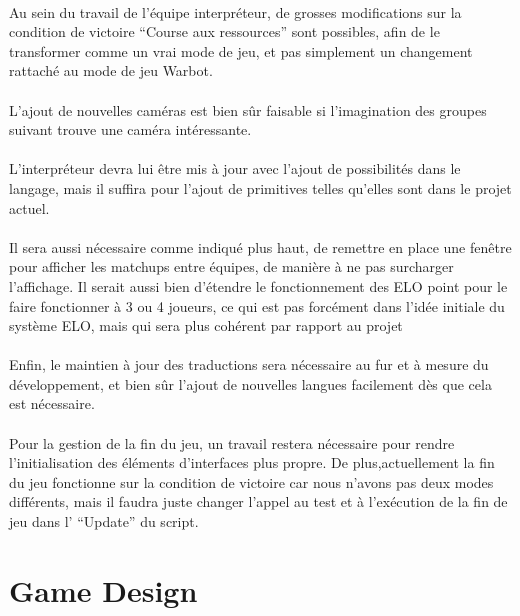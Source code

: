 \documentclass{report}
\begin{document}
\paragraph{}
Au sein du travail de l’équipe interpréteur, de grosses modifications sur la condition de victoire “Course aux ressources” sont possibles, afin de le transformer comme un vrai mode de jeu, et pas simplement un changement rattaché au mode de jeu Warbot. 
\paragraph{}
L’ajout de nouvelles caméras est bien sûr faisable si l’imagination des groupes suivant trouve une caméra intéressante. 
\paragraph{}
L’interpréteur devra lui être mis à jour avec l’ajout de possibilités dans le langage, mais il suffira pour l’ajout de primitives telles qu’elles sont dans le projet actuel.
\paragraph{}
Il sera aussi nécessaire comme indiqué plus haut, de remettre en place une fenêtre pour afficher les matchups entre équipes, de manière à ne pas surcharger l’affichage. Il serait aussi bien d’étendre le fonctionnement des ELO point pour le faire fonctionner à 3 ou 4 joueurs, ce qui est pas forcément dans l’idée initiale du système ELO, mais qui sera plus cohérent par rapport au projet
\paragraph{}
Enfin, le maintien à jour des traductions sera nécessaire au fur et à mesure du développement, et bien sûr l’ajout de nouvelles langues facilement dès que cela est nécessaire.
\paragraph{}
Pour la gestion de la fin du jeu, un travail restera nécessaire pour rendre l’initialisation des éléments d’interfaces plus propre. De plus,actuellement la fin du jeu fonctionne sur la condition de victoire car nous n’avons pas deux modes différents, mais il faudra juste changer l’appel au test et à l'exécution de la fin de jeu dans l’ “Update” du script.

\section{Game Design}
\end{document}
